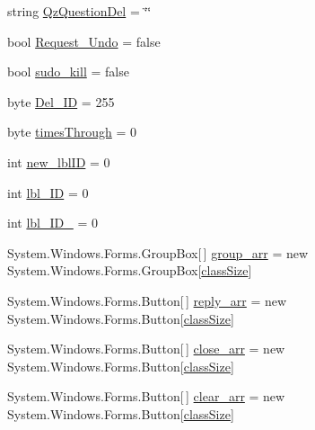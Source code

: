 \begin{DoxyCompactItemize}
\item 
string \hyperlink{class_sr_p___classroom_inq_1_1frm_classrrom_inq_a1fe88369748706492ccc7292a0e47331}{\-Qz\-Question\-Del} = \char`\"{}\char`\"{}
\item 
bool \hyperlink{class_sr_p___classroom_inq_1_1frm_classrrom_inq_acb5bab8dcbcbfc8ed7a5b260ddba84e3}{\-Request\-\_\-\-Undo} = false
\item 
bool \hyperlink{class_sr_p___classroom_inq_1_1frm_classrrom_inq_a3ac2217a30904b65be786ee00a312fea}{sudo\-\_\-kill} = false
\item 
byte \hyperlink{class_sr_p___classroom_inq_1_1frm_classrrom_inq_a9874b3534409b79a483f08f2aa03668d}{\-Del\-\_\-\-I\-D} = 255
\item 
byte \hyperlink{class_sr_p___classroom_inq_1_1frm_classrrom_inq_ab730336bf81938256d6f20922c15484b}{times\-Through} = 0
\item 
int \hyperlink{class_sr_p___classroom_inq_1_1frm_classrrom_inq_a561cfd5c0d34d4adcb14aee4efc01643}{new\-\_\-lbl\-I\-D} = 0
\item 
int \hyperlink{class_sr_p___classroom_inq_1_1frm_classrrom_inq_a15d44adc56e5e6523bfadd27d9966935}{lbl\-\_\-\-I\-D} = 0
\item 
int \hyperlink{class_sr_p___classroom_inq_1_1frm_classrrom_inq_a5d14fbec9e02ebe6942d26ae8ed53d3b}{lbl\-\_\-\-I\-D\-\_} = 0
\item 
\-System.\-Windows.\-Forms.\-Group\-Box\mbox{[}$\,$\mbox{]} \hyperlink{class_sr_p___classroom_inq_1_1frm_classrrom_inq_a68d2b307c87e71592f6e170c9ce2aad2}{group\-\_\-arr} = new \-System.\-Windows.\-Forms.\-Group\-Box\mbox{[}\hyperlink{class_sr_p___classroom_inq_1_1frm_classrrom_inq_a78d9aab335edfe53d39036b9d89928a8}{class\-Size}\mbox{]}
\item 
\-System.\-Windows.\-Forms.\-Button\mbox{[}$\,$\mbox{]} \hyperlink{class_sr_p___classroom_inq_1_1frm_classrrom_inq_a46ee30d934a5219840e4381a66728f0f}{reply\-\_\-arr} = new \-System.\-Windows.\-Forms.\-Button\mbox{[}\hyperlink{class_sr_p___classroom_inq_1_1frm_classrrom_inq_a78d9aab335edfe53d39036b9d89928a8}{class\-Size}\mbox{]}
\item 
\-System.\-Windows.\-Forms.\-Button\mbox{[}$\,$\mbox{]} \hyperlink{class_sr_p___classroom_inq_1_1frm_classrrom_inq_a4758f35d344b79b972e88a42cb660904}{close\-\_\-arr} = new \-System.\-Windows.\-Forms.\-Button\mbox{[}\hyperlink{class_sr_p___classroom_inq_1_1frm_classrrom_inq_a78d9aab335edfe53d39036b9d89928a8}{class\-Size}\mbox{]}
\item 
\-System.\-Windows.\-Forms.\-Button\mbox{[}$\,$\mbox{]} \hyperlink{class_sr_p___classroom_inq_1_1frm_classrrom_inq_a1c427c3d5bb61c96ca798e5f6aaff8f4}{clear\-\_\-arr} = new \-System.\-Windows.\-Forms.\-Button\mbox{[}\hyperlink{class_sr_p___classroom_inq_1_1frm_classrrom_inq_a78d9aab335edfe53d39036b9d89928a8}{class\-Size}\mbox{]}

\end{DoxyCompactItemize}
